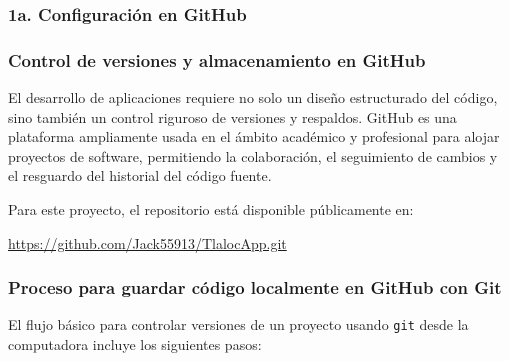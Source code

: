 \newpage
\subsubsection{1a. Configuración en GitHub}

\subsubsection*{Control de versiones y almacenamiento en GitHub}

El desarrollo de aplicaciones requiere no solo un diseño estructurado del código, sino también un control riguroso de versiones y respaldos. GitHub es una plataforma ampliamente usada en el ámbito académico y profesional para alojar proyectos de software, permitiendo la colaboración, el seguimiento de cambios y el resguardo del historial del código fuente. 

Para este proyecto, el repositorio está disponible públicamente en:
\begin{center}
\url{https://github.com/Jack55913/TlalocApp.git}
\end{center}

\subsubsection*{Proceso para guardar código localmente en GitHub con Git}

El flujo básico para controlar versiones de un proyecto usando \texttt{git} desde la computadora incluye los siguientes pasos:

